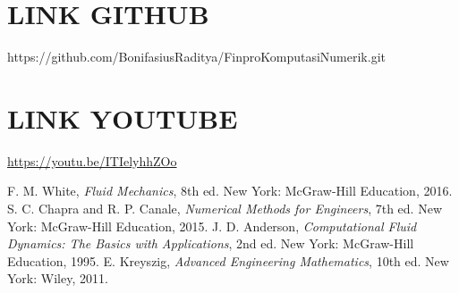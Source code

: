 \documentclass[conference]{IEEEtran}
\begin{document}
\section{LINK GITHUB}
https://github.com/BonifasiusRaditya/FinproKomputasiNumerik.git

\section{LINK YOUTUBE}
\url{https://youtu.be/ITIelyhhZOo} \\

\begin{thebibliography}{00}
 F. M. White, \textit{Fluid Mechanics}, 8th ed. New York: McGraw-Hill Education, 2016.
 S. C. Chapra and R. P. Canale, \textit{Numerical Methods for Engineers}, 7th ed. New York: McGraw-Hill Education, 2015.
 J. D. Anderson, \textit{Computational Fluid Dynamics: The Basics with Applications}, 2nd ed. New York: McGraw-Hill Education, 1995.
 E. Kreyszig, \textit{Advanced Engineering Mathematics}, 10th ed. New York: Wiley, 2011.
\end{thebibliography}
\vspace{12pt}
\end{document}
